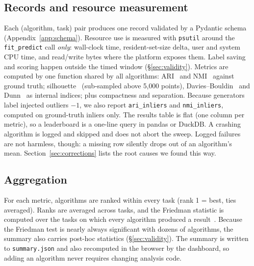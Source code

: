 \documentclass[11pt,a4paper]{article}
\newcommand{\code}[1]{\texttt{#1}}
\begin{document}
\subsection{Records and resource measurement}
Each (algorithm, task) pair produces one record validated by a Pydantic schema
(Appendix~\ref{app:schema}). Resource use is measured with \code{psutil}
around the \code{fit\_predict} call \emph{only}: wall-clock time,
resident-set-size delta, user and system CPU time, and read/write bytes where
the platform exposes them. Label saving and scoring happen outside the timed
window (\S\ref{sec:validity}). Metrics are computed by one function shared by all algorithms:
ARI~\cite{hubert1985comparing} and NMI~\cite{strehl2002cluster} against
ground truth; silhouette~\cite{rousseeuw1987silhouettes} (sub-sampled above
5{,}000 points), Davies--Bouldin~\cite{davies1979cluster} and
Dunn~\cite{dunn1973fuzzy} as internal indices; plus compactness and
separation. Because generators label injected outliers $-1$, we also report
\code{ari\_inliers} and \code{nmi\_inliers}, computed on ground-truth inliers
only. The results table is flat (one column per metric), so a
leaderboard is a one-line query in pandas or DuckDB. A crashing algorithm is
logged and skipped and does not abort the sweep. Logged failures are not
harmless, though: a missing row silently drops out of an algorithm's mean.
Section~\ref{sec:corrections} lists the root causes we found this way.

\subsection{Aggregation}
For each metric, algorithms are ranked within every task (rank 1 = best,
ties averaged). Ranks are averaged across tasks, and the Friedman
statistic is computed over the tasks on which every algorithm produced a
result~\cite{demsar2006statistical}. Because the Friedman test is nearly
always significant with dozens of algorithms, the summary also carries
post-hoc statistics (\S\ref{sec:validity}). The summary is written to
\code{summary.json} and also recomputed in the browser by the dashboard, so
adding an algorithm never requires changing analysis code.
\end{document}
